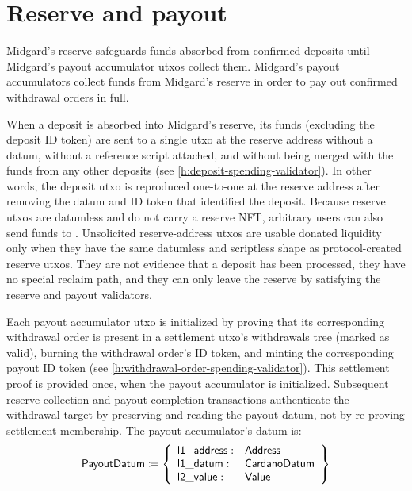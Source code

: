\documentclass[../midgard.tex]{subfiles}
\begin{document}
\section{Reserve and payout}
\label{h:reserve-and-payout}

Midgard's reserve safeguards funds absorbed from confirmed deposits until Midgard's payout accumulator utxos collect them.
Midgard's payout accumulators collect funds from Midgard's reserve in order to pay out confirmed withdrawal orders in full.

When a deposit is absorbed into Midgard's reserve, its funds (excluding the deposit ID token) are sent to a single utxo at the reserve address without a datum, without a reference script attached, and without being merged with the funds from any other deposits (see \cref{h:deposit-spending-validator}).
In other words, the deposit utxo is reproduced one-to-one at the reserve address after removing the datum and ID token that identified the deposit.
Because reserve utxos are datumless and do not carry a reserve NFT, arbitrary users can also send funds to .
Unsolicited reserve-address utxos are usable donated liquidity only when they have the same datumless and scriptless shape as protocol-created reserve utxos.
They are not evidence that a deposit has been processed, they have no special reclaim path, and they can only leave the reserve by satisfying the reserve and payout validators.

Each payout accumulator utxo is initialized by proving that its corresponding withdrawal order is present in a settlement utxo's withdrawals tree (marked as valid), burning the withdrawal order's ID token, and minting the corresponding payout ID token (see \cref{h:withdrawal-order-spending-validator}).
This settlement proof is provided once, when the payout accumulator is initialized.
Subsequent reserve-collection and payout-completion transactions authenticate the withdrawal target by preserving and reading the payout datum, not by re-proving settlement membership.
The payout accumulator's datum is:
\begin{equation*}
  \mathsf{PayoutDatum} \coloneq \left\{
  \begin{array}{ll}
    \mathsf{l1\_address}: & \mathsf{Address} \\
    \mathsf{l1\_datum}: & \mathsf{CardanoDatum} \\
    \mathsf{l2\_value}: & \mathsf{Value}
  \end{array}\right\}
\end{equation*}
\end{document}
